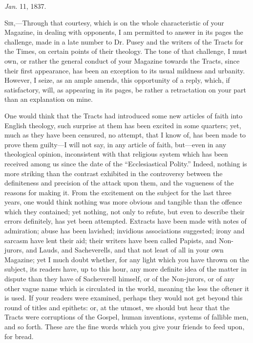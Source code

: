 
\emph{Jan}. 11, 1837.

S\textsc{ir},—Through that courtesy, which is on the whole characteristic of
your Magazine, in dealing with opponents, I am permitted to answer in
its pages the challenge, made in a late number to Dr. Pusey and the
writers of the Tracts for the Times, on certain points of their
theology. The tone of that challenge, I must own, or rather the
general conduct of your Magazine towards the Tracts, since their first
appearance, has been an exception to its usual mildness and urbanity.
However, I seize, as an ample amends, this opportunity of a reply,
which, if satisfactory, will, as appearing in its pages, be rather a
retractation on your part than an explanation on mine.

One would think that the Tracts had introduced
some new articles of faith into English theology, such surprise at
them has been excited in some quarters; yet, much as they have been
censured, no attempt, that I know of, has been made to prove them
guilty—I will not say, in any article of faith, but—even in any
theological opinion, inconsistent with that religious system which has
been received among us since the date of the ``Ecclesiastical Polity.''
Indeed, nothing is more striking than the contrast exhibited in the
controversy between the definiteness and precision of the attack upon
them, and the vagueness of the reasons for making it. From the
excitement on the subject for the last three years, one would think
nothing was more obvious and tangible than the offence which they
contained; yet nothing, not only to refute, but even to describe their
errors definitely, has yet been attempted. Extracts have been made
with notes of admiration; abuse has been lavished; invidious
associations suggested; irony and sarcasm have lent their aid; their
writers have been called Papists, and Non-jurors, and Lauds, and
Sacheverells, and that not least of all in your own Magazine; yet I
much doubt whether, for any light which you have thrown on the
subject, its readers have, up to this hour, any more definite idea of
the matter in dispute than they have of Sacheverell himself, or of the
Non-jurors, or of any other vague name which is circulated in the
world, meaning the less the oftener it is used. If your readers were
examined, perhaps they would not get beyond this round of titles and
epithets: or, at the utmost, we should but hear that the Tracts were
corruptions of the Gospel, human inventions, systems of fallible men,
and so forth. These are the fine words which you give your friends to
feed upon, for bread.


